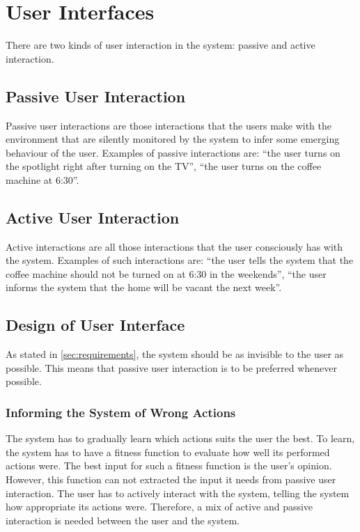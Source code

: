 \section{User Interfaces}\label{sec:userInterfaces}
There are two kinds of user interaction in the system: passive and active interaction.

\subsection{Passive User Interaction}
Passive user interactions are those interactions that the users make with the environment that are silently monitored by the system to infer some emerging behaviour of the user. Examples of passive interactions are: \enquote{the user turns on the spotlight right after turning on the TV}, \enquote{the user turns on the coffee machine at 6:30}.

\subsection{Active User Interaction}
Active interactions are all those interactions that the user consciously has with the system. Examples of such interactions are: \enquote{the user tells the system that the coffee machine should not be turned on at 6:30 in the weekends}, \enquote{the user informs the system that the home will be vacant the next week}.

\subsection{Design of User Interface}
As stated in \cref{sec:requirements}, the system should be as invisible to the user as possible. This means that passive user interaction is to be preferred whenever possible. 

\subsubsection{Informing the System of Wrong Actions}

The system has to gradually learn which actions suits the user the best. To learn, the system has to have a fitness function to evaluate how well its performed actions were. The best input for such a fitness function is the user's opinion. However, this function can not extracted the input it needs from passive user interaction. The user has to actively interact with the system, telling the system how appropriate its actions were. Therefore, a mix of active and passive interaction is needed between the user and the system.

